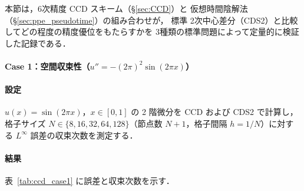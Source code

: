 %
%


本節は，6次精度 CCD スキーム（§\ref{sec:CCD}）と
仮想時間陰解法（§\ref{sec:ppe_pseudotime}）の組み合わせが，
標準 2次中心差分（CDS2）と比較してどの程度の精度優位をもたらすかを
3種類の標準問題によって定量的に検証した記録である．

\paragraph{Case 1：空間収束性（\texorpdfstring{$u'' = -(2\pi)^2\sin(2\pi x)$}{u'' = -(2pi)\^{}2 sin(2pi x)}）}\label{app:ccd_case1}

\paragraph{設定}
$u(x) = \sin(2\pi x)$，$x \in [0,1]$ の 2 階微分を CCD および CDS2 で計算し，
格子サイズ $N \in \{8, 16, 32, 64, 128\}$（節点数 $N+1$，格子間隔 $h=1/N$）に対する
$L^\infty$ 誤差の収束次数を測定する．

\paragraph{結果}
表~\ref{tab:ccd_case1} に誤差と収束次数を示す．


